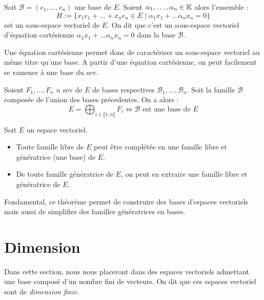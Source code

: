 \begin{theorem}
    Soit $ \mathcal{B} = (e_1, \dots , e_n)$ une base de $E$. 
    Soient $ \alpha_1, \dots , \alpha_n \in \mathbb{K}$ alors l'ensemble : 
        \[ H := \{x_1 e_1 + \dots + x_n e_n \in E \; | \; \alpha_1 x_1 + \dots \alpha_n x_n = 0 \} \] 
    est un sous-espace vectoriel de $E$. On dit que c'est un sous-espace vectoriel d'équation cartésienne 
    $\alpha_1 x_1 + \dots \alpha_n x_n = 0 $ dans la base $ \mathcal{B}$. 
\end{theorem}

Une équation cartésienne permet donc de caractériser un sous-espace vectoriel au même titre qu'une base. 
A partir d'une équation cartésienne, on peut facilement se ramener à une base du sev. 

\begin{theorem}
    Soient $F_1, \dots , F_n$ $n$ sev de $E$ de bases respectives $ \mathcal{B}_1, \dots , \mathcal{B}_n$. 
    Soit la famille $ \mathcal{B}$ composée de l'union des bases précedentes. On a alors : 
        \[ E = \bigoplus_{i \in \llbracket 1, n \rrbracket} F_i \iff \mathcal{B} \text{ est une base de } E \] 
\end{theorem}


\begin{theorem}
    Soit $E$ un espace vectoriel. 
    \begin{itemize}
        \item Toute famille libre de $E$ peut être complétée en une famille libre et génératrice (une base) de $E$. 
        \item De toute famille génératrice de $E$, on peut en extraire une famille libre et génératrice de $E$. 
    \end{itemize}
\end{theorem}

Fondamental, ce théorème permet de construire des bases d'espaces vectoriels mais aussi de simplifier des familles 
génératrices en bases.



\section{Dimension}

Dans cette section, nous nous placeront dans des espaces vectoriels admettant une base composé 
d'un nombre fini de vecteurs. On dit que ces espaces vectoriel sont de \emph{dimension finie}. 

